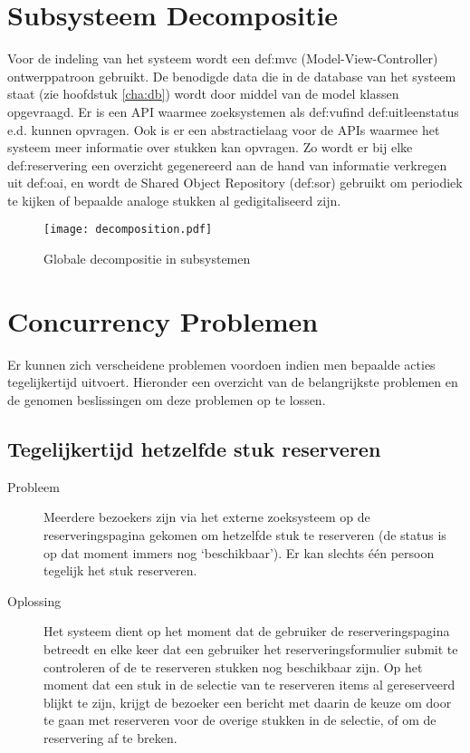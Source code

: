 \documentclass[a4paper,titlepage]{report}
\begin{document}
  \section{Subsysteem Decompositie}
  \label{sec:subsystem_decomp}
  Voor de indeling van het systeem wordt een \gls{def:mvc} (Model-View-Controller)
  ontwerppatroon gebruikt. De benodigde data die in de database van het systeem
  staat (zie hoofdstuk \ref{cha:db}) wordt door middel van de model klassen
  opgevraagd. Er is een API waarmee zoeksystemen als \gls{def:vufind}
  \gls{def:uitleenstatus} e.d. kunnen opvragen. Ook is er een abstractielaag
  voor de APIs waarmee het systeem meer informatie over stukken kan opvragen. Zo
  wordt er bij elke \gls{def:reservering} een overzicht
  gegenereerd aan de hand van informatie verkregen uit \gls{def:oai}, en wordt
  de Shared Object Repository (\gls{def:sor}) gebruikt om periodiek te kijken of
  bepaalde analoge stukken al gedigitaliseerd zijn.

  \begin{figure}[H]
    \label{fig:decomposition}
    \centering
    \texttt{[image: decomposition.pdf]}
    \caption{Globale decompositie in subsystemen}
  \end{figure}
    
  \section{Concurrency Problemen}
  \label{sec:concurrency}
  Er kunnen zich verscheidene problemen voordoen indien men bepaalde acties
  tegelijkertijd uitvoert. Hieronder een overzicht van de belangrijkste
  problemen en de genomen beslissingen om deze problemen op te
  lossen.
  
    \subsection{Tegelijkertijd hetzelfde stuk reserveren}
    \begin{description}
      \item[Probleem] Meerdere bezoekers zijn via het externe zoeksysteem op
        de reserveringspagina gekomen om hetzelfde stuk te reserveren (de
        status is op dat moment immers nog `beschikbaar'). Er kan slechts
        \'e\'en persoon tegelijk het stuk reserveren.
      \item[Oplossing] Het systeem dient op het moment dat de gebruiker de
        reserveringspagina betreedt en elke keer dat een gebruiker het
        reserveringsformulier submit te controleren of de te reserveren
        stukken nog beschikbaar zijn. Op het moment dat een stuk in de
        selectie van te reserveren items al gereserveerd blijkt te zijn,
        krijgt de bezoeker een bericht met daarin de keuze om door te gaan met
        reserveren voor de overige stukken in de selectie, of om de
        reservering af te breken.
    \end{description}
    
\end{document}

